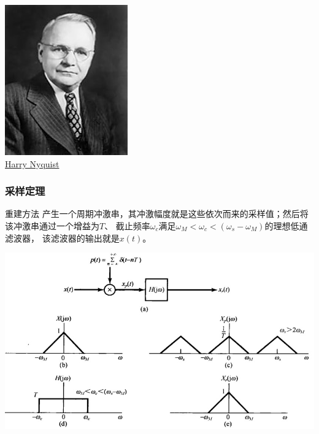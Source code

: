 \documentclass[CJKutf8,xcolor=pdftex,dvipsnames,table]{beamer}
\begin{document}
\begin{CJK*}{UTF8}{song}
\begin{frame}
    \begin{center}
      \includegraphics[scale=.5]{Harry_Nyquist} \\
      \href{https://en.wikipedia.org/wiki/Harry_Nyquist}{Harry Nyquist}      
    \end{center}
  \end{frame}  
       
  \begin{frame}
    \frametitle{采样定理}
	\begin{block}{重建方法}
		产生一个周期冲激串，其冲激幅度就是这些依次而来的采样值；然后将该冲激串通过一个增益为$T$、
		截止频率$\omega_c$满足$\omega_M < \omega_c < (\omega_s-\omega_M)$的理想低通滤波器，
		该滤波器的输出就是$x(t)$。
	\end{block}
    \begin{center}
      \includegraphics[scale=.3]{ss-c-f7-4}
    \end{center}
  \end{frame} 
         

\end{CJK*}
\end{document}
